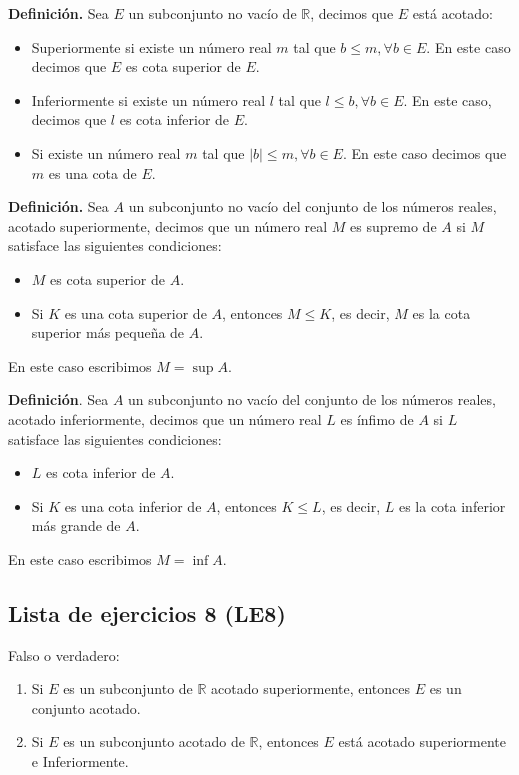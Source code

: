 \documentclass[11pt]{article}
\newcommand{\R}{\mathbb{R}}
\begin{document}
\pagebreak

\textbf{Definición.} Sea $E$ un subconjunto no vacío de $\R$, decimos que $E$ está acotado: \begin{itemize}
    \item Superiormente si existe un número real $m$ tal que $b \leq m, \forall b\in E$. En este caso decimos que $E$ es cota superior de $E$.
    \item Inferiormente si existe un número real $l$ tal que $l \leq b, \forall b\in E$. En este caso, decimos que $l$ es cota inferior de $E$.
    \item Si existe un número real $m$ tal que $|b|\leq m,\forall b \in E$. En este caso decimos que $m$ es una cota de $E$.
\end{itemize}

\textbf{Definición.} Sea $A$ un subconjunto no vacío del conjunto de los números reales, acotado superiormente, decimos que un número real $M$ es supremo de $A$ si $M$ satisface las siguientes condiciones: \begin{itemize}
    \item $M$ es cota superior de $A$.
    \item Si $K$ es una cota superior de $A$, entonces $M\leq K$, es decir, $M$ es la cota superior más pequeña de $A$.
\end{itemize}

En este caso escribimos $M=\sup{A}$.

\textbf{Definición}. Sea $A$ un subconjunto no vacío del conjunto de los números reales, acotado inferiormente, decimos que un número real $L$ es ínfimo de $A$ si $L$ satisface las siguientes condiciones: \begin{itemize}
    \item $L$ es cota inferior de $A$.
    \item Si $K$ es una cota inferior de $A$, entonces $K\leq L$, es decir, $L$ es la cota inferior más grande de $A$.
\end{itemize}

En este caso escribimos $M=\inf{A}$.

\subsection*{Lista de ejercicios 8 (LE8)}

Falso o verdadero: \begin{enumerate}[label=\arabic*.]
    \item Si $E$ es un subconjunto de $\R$ acotado superiormente, entonces $E$ es un conjunto acotado.
    \item Si $E$ es un subconjunto acotado de $\R$, entonces $E$ está acotado superiormente e Inferiormente.
\end{enumerate}
\end{document}
